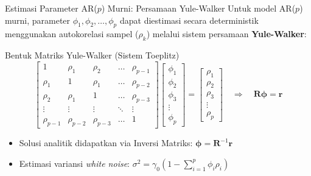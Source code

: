 \documentclass[aspectratio=169, 10pt]{beamer}
\begin{document}
\begin{frame}{Estimasi Parameter AR($p$) Murni: Persamaan Yule-Walker}
    Untuk model AR($p$) murni, parameter $\phi_1, \phi_2, \dots, \phi_p$ dapat diestimasi secara deterministik menggunakan autokorelasi sampel ($\rho_k$) melalui sistem persamaan \textbf{Yule-Walker}:
    \begin{block}{Bentuk Matriks Yule-Walker (Sistem Toeplitz)}
        \begin{equation}
            \begin{bmatrix}
                1 & \rho_1 & \rho_2 & \dots & \rho_{p-1} \\
                \rho_1 & 1 & \rho_1 & \dots & \rho_{p-2} \\
                \rho_2 & \rho_1 & 1 & \dots & \rho_{p-3} \\
                \vdots & \vdots & \vdots & \ddots & \vdots \\
                \rho_{p-1} & \rho_{p-2} & \rho_{p-3} & \dots & 1
            \end{bmatrix}
            \begin{bmatrix}
                \phi_1 \\ \phi_2 \\ \phi_3 \\ \vdots \\ \phi_p
            \end{bmatrix}
            =
            \begin{bmatrix}
                \rho_1 \\ \rho_2 \\ \rho_3 \\ \vdots \\ \rho_p
            \end{bmatrix}
            \quad \Longrightarrow \quad \mathbf{R} \boldsymbol{\phi} = \mathbf{r}
        \end{equation}
    \end{block}
    \vspace{0.1cm}
    \begin{itemize}
        \item Solusi analitik didapatkan via Inversi Matriks: $\boldsymbol{\phi} = \mathbf{R}^{-1} \mathbf{r}$
        \item Estimasi variansi \textit{white noise}: $\sigma^2 = \gamma_0 \left( 1 - \sum_{i=1}^p \phi_i \rho_i \right)$
    \end{itemize}
\end{frame}
\end{document}
